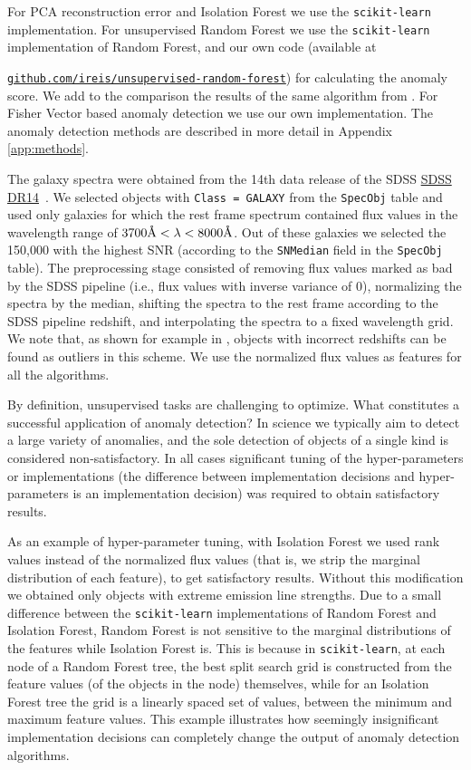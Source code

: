 \documentclass[fleqn,usenatbib]{mnras}
\newcommand{\angstrom}{\mbox{\normalfont\AA}}
\newcommand{\sklearn}{\texttt{scikit-learn}}
\begin{document}
For  PCA reconstruction error and Isolation Forest \citep{liu08} we use the  \sklearn{} implementation. For unsupervised Random Forest we use  the \sklearn{} implementation of Random Forest, and our own code (available at {\href{https://github.com/ireis/unsupervised-random-forest}{\texttt{github.com/ireis/unsupervised-random-forest}}) for calculating the anomaly score. We add to the comparison the results of the same algorithm  from \cite{baron17a}. For Fisher Vector based anomaly detection \citep{rotman19} we use our own implementation. The anomaly detection methods are described in more detail in Appendix \ref{app:methods}.
  
The galaxy spectra were obtained from the 14th data release of the SDSS \href{https://www.sdss.org/dr14/}{SDSS DR14}~\citep{abolfathi17}. We selected objects with \texttt{Class = GALAXY} from the \texttt{SpecObj} table and used only galaxies for which the rest frame spectrum contained flux values in the  wavelength range of $3700 \angstrom < \lambda  < 8000 \angstrom$. Out of these galaxies we selected the 150,000 with the highest SNR (according to the \texttt{SNMedian} field in the \texttt{SpecObj} table). 
The preprocessing stage consisted of removing flux values marked as bad by the SDSS pipeline (i.e., flux values with inverse variance of 0), normalizing the spectra by the median, shifting the spectra to the rest frame according to the SDSS pipeline redshift, and  interpolating  the spectra to a fixed wavelength grid. We note that, as shown for example in \citet{baron17a}, objects with incorrect redshifts can be found as outliers in this scheme. We use the normalized flux values as features for all the algorithms. 


By definition, unsupervised tasks are challenging to optimize. What constitutes a successful application of anomaly detection? In science we typically aim to detect a large variety of anomalies, and the sole detection of objects of a single kind is considered non-satisfactory. In all cases significant tuning of the hyper-parameters or implementations (the difference between implementation decisions and hyper-parameters is  an  implementation decision) was required to obtain satisfactory results. 


As an example of hyper-parameter tuning, with Isolation Forest we used rank values instead of the normalized flux values (that is, we strip the marginal distribution of each feature), to get satisfactory results. Without this modification we obtained only objects with extreme emission line strengths. Due to a small difference between the  \sklearn{} implementations of Random Forest and Isolation Forest, Random Forest is not sensitive to the marginal distributions of the features while Isolation Forest is. This is because in \sklearn{}, at each node of a Random Forest tree, the best split search grid is constructed from the feature values (of the objects in the node) themselves, while for an Isolation Forest tree the grid is a linearly spaced set of values, between the minimum and maximum feature values. This example illustrates  how seemingly insignificant implementation decisions can completely change the output of anomaly detection algorithms.  

}
\end{document}
